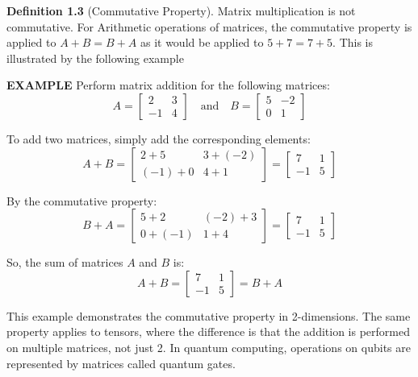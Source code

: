 \documentclass{report}
\begin{document}
\noindent \textbf{Definition 1.3} (Commutative Property).
Matrix multiplication is not commutative. For Arithmetic operations of matrices, the commutative property is applied to $A + B = B + A$ as it would be applied to $5 + 7 = 7 + 5$. This is illustrated by the following example
\begin{tcolorbox}[colback=gray!10, boxrule=0pt]
    \textbf{EXAMPLE}
    Perform matrix addition for the following matrices:
    \[
    A = \begin{bmatrix}
    2 & 3 \\
    -1 & 4
    \end{bmatrix}
    \quad \text{and} \quad
    B = \begin{bmatrix}
    5 & -2 \\
    0 & 1
    \end{bmatrix}
    \]
    
    To add two matrices, simply add the corresponding elements:
    \[
    A + B = \begin{bmatrix}
    2 + 5 & 3 + (-2) \\
    (-1) + 0 & 4 + 1
    \end{bmatrix}
    = \begin{bmatrix}
    7 & 1 \\
    -1 & 5
    \end{bmatrix}
    \]
    
    By the commutative property:
    \[
    B + A = \begin{bmatrix}
    5 + 2 & (-2) + 3 \\
    0 + (-1) & 1 + 4
    \end{bmatrix}
    =  \begin{bmatrix}
    7 & 1 \\
    -1 & 5
    \end{bmatrix}
    \]
    
    So, the sum of matrices \(A\) and \(B\) is:
    \[
    A + B = \begin{bmatrix}
    7 & 1 \\
    -1 & 5
    \end{bmatrix} = B + A
    \]
\end{tcolorbox}
\noindent This example demonstrates the commutative property in 2-dimensions. The same property applies to tensors, where the difference is that the addition is performed on multiple matrices, not just 2. In quantum computing, operations on qubits are represented by matrices called quantum gates. 
\end{document}
